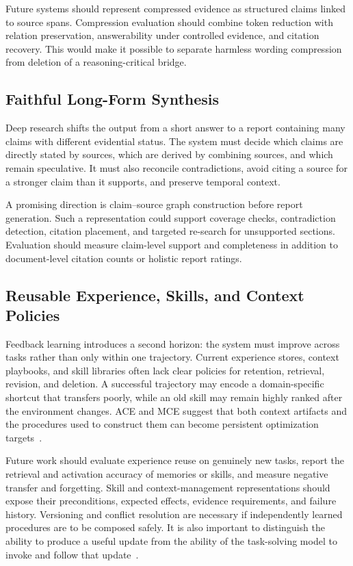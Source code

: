 Future systems should represent compressed evidence as structured claims linked to source spans. Compression evaluation should combine token reduction with relation preservation, answerability under controlled evidence, and citation recovery. This would make it possible to separate harmless wording compression from deletion of a reasoning-critical bridge.

\subsection{Faithful Long-Form Synthesis}
Deep research shifts the output from a short answer to a report containing many claims with different evidential status. The system must decide which claims are directly stated by sources, which are derived by combining sources, and which remain speculative. It must also reconcile contradictions, avoid citing a source for a stronger claim than it supports, and preserve temporal context.

A promising direction is claim--source graph construction before report generation. Such a representation could support coverage checks, contradiction detection, citation placement, and targeted re-search for unsupported sections. Evaluation should measure claim-level support and completeness in addition to document-level citation counts or holistic report ratings.

\subsection{Reusable Experience, Skills, and Context Policies}
Feedback learning introduces a second horizon: the system must improve across tasks rather than only within one trajectory. Current experience stores, context playbooks, and skill libraries often lack clear policies for retention, retrieval, revision, and deletion. A successful trajectory may encode a domain-specific shortcut that transfers poorly, while an old skill may remain highly ranked after the environment changes. ACE and MCE suggest that both context artifacts and the procedures used to construct them can become persistent optimization targets~\cite{zhang2026ace,ye2026mce}.

Future work should evaluate experience reuse on genuinely new tasks, report the retrieval and activation accuracy of memories or skills, and measure negative transfer and forgetting. Skill and context-management representations should expose their preconditions, expected effects, evidence requirements, and failure history. Versioning and conflict resolution are necessary if independently learned procedures are to be composed safely. It is also important to distinguish the ability to produce a useful update from the ability of the task-solving model to invoke and follow that update~\cite{lin2026harnessbenefit}.

